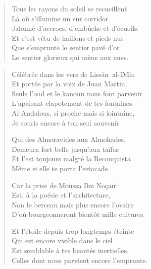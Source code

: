 \begin{verse}
Tous les rayons du soleil se recueillent\\
Là où s’illumine un sur corridor\\
Jalonné d’accrocs, d’embûche et d’écueils.\\
Et c’est vêtu de haillons et pieds nus\\
Que s’emprunte le sentier pavé d’or\\
Le sentier glorieux qui mène aux nues.
\end{verse}

\begin{verse}
Célébrée dans les vers de Lissān~al-Ḋḋīn\\
Et portée par la voix de Juan Martin,\\
Seuls l’oud et le kanoun\label{foot.kanoun} nous font parvenir\\
L’apaisant clapotement de tes fontaines.\\
Al-Andalous, si proche mais si lointaine,\\
Je souris encore à ton seul souvenir.

Qui des Almoravides aux Almohades,\\
Demeura fort belle jusqu’aux taïfas\\
Et l’est toujours malgré la Reconquista\\
Même si elle te porta l’estocade.

Car la prise de  Moussa Ibn Noçaïr\\
Est, à la poésie et l’architecture,\\
Non le berceau mais plus encore l’ovaire\\
D’où bourgeonneront bientôt mille cultures.

Et l’étoile depuis trop longtemps éteinte\\
Qui est encore visible dans le ciel\\
Est semblable à tes beautés inertielles,\\
Celles dont nous parvient encore l’emprunte.


\end{verse}
